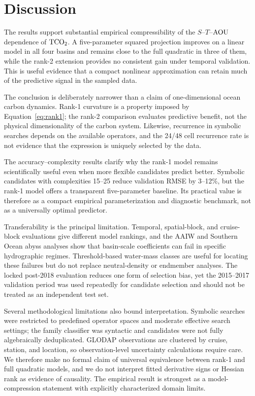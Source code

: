 \section{Discussion}

The results support substantial empirical compressibility of the $S$--$T$--$\mathrm{AOU}$ dependence of $\mathrm{TCO_2}$. A five-parameter squared projection improves on a linear model in all four basins and remains close to the full quadratic in three of them, while the rank-2 extension provides no consistent gain under temporal validation. This is useful evidence that a compact nonlinear approximation can retain much of the predictive signal in the sampled data.

The conclusion is deliberately narrower than a claim of one-dimensional ocean carbon dynamics. Rank-1 curvature is a property imposed by Equation~\ref{eq:rank1}; the rank-2 comparison evaluates predictive benefit, not the physical dimensionality of the carbon system. Likewise, recurrence in symbolic searches depends on the available operators, and the 24/48 cell recurrence rate is not evidence that the expression is uniquely selected by the data.

The accuracy--complexity results clarify why the rank-1 model remains scientifically useful even when more flexible candidates predict better. Symbolic candidates with complexities 15--25 reduce validation RMSE by 3--12\%, but the rank-1 model offers a transparent five-parameter baseline. Its practical value is therefore as a compact empirical parameterization and diagnostic benchmark, not as a universally optimal predictor.

Transferability is the principal limitation. Temporal, spatial-block, and cruise-block evaluations give different model rankings, and the AAIW and Southern Ocean abyss analyses show that basin-scale coefficients can fail in specific hydrographic regimes. Threshold-based water-mass classes are useful for locating these failures but do not replace neutral-density or endmember analyses. The locked post-2018 evaluation reduces one form of selection bias, yet the 2015--2017 validation period was used repeatedly for candidate selection and should not be treated as an independent test set.

Several methodological limitations also bound interpretation. Symbolic searches were restricted to predefined operator spaces and moderate effective search settings; the family classifier was syntactic and candidates were not fully algebraically deduplicated. GLODAP observations are clustered by cruise, station, and location, so observation-level uncertainty calculations require care. We therefore make no formal claim of universal equivalence between rank-1 and full quadratic models, and we do not interpret fitted derivative signs or Hessian rank as evidence of causality. The empirical result is strongest as a model-compression statement with explicitly characterized domain limits.
